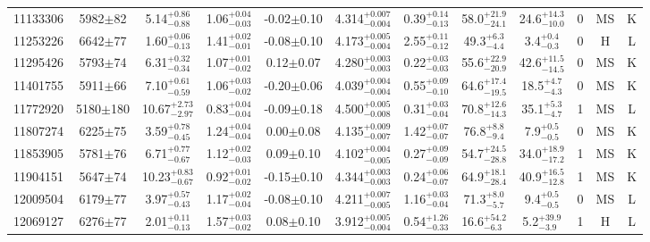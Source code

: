 \begin{longtable}{c|ccccc|ccc|ccc}
11133306 & 5982$\pm$82   & 5.14$_{-0.88}^{+0.86}$    & 1.06$_{-0.03}^{+0.04}$ & -0.02$\pm$0.10    & 4.314$_{-0.004}^{+0.007}$ & 0.39$_{-0.13}^{+0.14}$ & 58.0$_{-24.1}^{+21.9}$    & 24.6$_{-10.0}^{+14.3}$   & 0 &        MS & K \\
11253226 & 6642$\pm$77   & 1.60$_{-0.13}^{+0.06}$    & 1.41$_{-0.01}^{+0.02}$ & -0.08$\pm$0.10    & 4.173$_{-0.004}^{+0.005}$ & 2.55$_{-0.12}^{+0.11}$ & 49.3$_{-4.4}^{+6.3}$      & 3.4$_{-0.3}^{+0.4}$      & 0 &        H & L \\
11295426 & 5793$\pm$74   & 6.31$_{-0.34}^{+0.32}$    & 1.07$_{-0.02}^{+0.01}$ & 0.12$\pm$0.07     & 4.280$_{-0.003}^{+0.003}$ & 0.22$_{-0.03}^{+0.03}$ & 55.6$_{-20.9}^{+22.9}$    & 42.6$_{-14.5}^{+11.5}$   & 0 &        MS & K \\
11401755 & 5911$\pm$66   & 7.10$_{-0.59}^{+0.61}$    & 1.06$_{-0.02}^{+0.03}$ & -0.20$\pm$0.06    & 4.039$_{-0.004}^{+0.004}$ & 0.55$_{-0.10}^{+0.09}$ & 64.6$_{-19.5}^{+17.4}$    & 18.5$_{-4.3}^{+4.7}$     & 0 &        MS & K \\
11772920 & 5180$\pm$180  & 10.67$_{-2.97}^{+2.73}$   & 0.83$_{-0.04}^{+0.04}$ & -0.09$\pm$0.18    & 4.500$_{-0.008}^{+0.005}$ & 0.31$_{-0.04}^{+0.03}$ & 70.8$_{-14.3}^{+12.6}$    & 35.1$_{-4.7}^{+5.3}$     & 1 &        MS & L \\
11807274 & 6225$\pm$75   & 3.59$_{-0.45}^{+0.78}$    & 1.24$_{-0.04}^{+0.04}$ & 0.00$\pm$0.08     & 4.135$_{-0.007}^{+0.009}$ & 1.42$_{-0.07}^{+0.07}$ & 76.8$_{-9.4}^{+8.8}$      & 7.9$_{-0.5}^{+0.5}$      & 0 &        MS & K \\
11853905 & 5781$\pm$76   & 6.71$_{-0.67}^{+0.77}$    & 1.12$_{-0.03}^{+0.02}$ & 0.09$\pm$0.10     & 4.102$_{-0.005}^{+0.004}$ & 0.27$_{-0.09}^{+0.09}$ & 54.7$_{-28.8}^{+24.5}$    & 34.0$_{-17.2}^{+18.9}$   & 1 &        MS & K \\
11904151 & 5647$\pm$74   & 10.23$_{-0.67}^{+0.83}$   & 0.92$_{-0.02}^{+0.01}$ & -0.15$\pm$0.10    & 4.344$_{-0.003}^{+0.003}$ & 0.24$_{-0.07}^{+0.06}$ & 64.9$_{-28.4}^{+18.1}$    & 40.9$_{-12.8}^{+16.5}$   & 1 &        MS & K \\
12009504 & 6179$\pm$77   & 3.97$_{-0.43}^{+0.57}$    & 1.17$_{-0.04}^{+0.02}$ & -0.08$\pm$0.10    & 4.211$_{-0.005}^{+0.007}$ & 1.16$_{-0.04}^{+0.03}$ & 71.3$_{-5.7}^{+8.0}$      & 9.4$_{-0.5}^{+0.5}$      & 0 &        MS & L \\
12069127 & 6276$\pm$77   & 2.01$_{-0.13}^{+0.11}$    & 1.57$_{-0.02}^{+0.03}$ & 0.08$\pm$0.10     & 3.912$_{-0.004}^{+0.005}$ & 0.54$_{-0.33}^{+1.26}$ & 16.6$_{-6.3}^{+54.2}$     & 5.2$_{-3.9}^{+39.9}$     & 1 &        H & L \\

\end{longtable}

